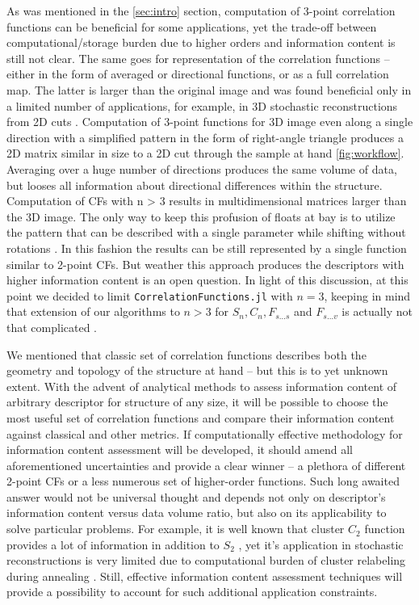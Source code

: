 \documentclass[reprint,amsmath,amssymb,aps,pre,showkeys,showpacs]{revtex4-1}
\newcommand{\code}[1]{\colorbox{light-gray}{\texttt{#1}}}
\begin{document}
As was mentioned in the \cref{sec:intro} section, computation of 3-point
correlation functions can be beneficial for some applications, yet the trade-off
between computational/storage burden due to higher orders and information
content is still not clear. The same goes for representation of the correlation
functions -- either in the form of averaged or directional functions, or as a
full correlation map. The latter is larger than the original image and was found
beneficial only in a limited number of applications, for example, in 3D
stochastic reconstructions from 2D cuts
\cite{cherkasov2021adaptive}. Computation of 3-point functions for 3D image even
along a single direction with a simplified pattern in the form of right-angle
triangle produces a 2D matrix similar in size to a 2D cut through the sample at
hand \cref{fig:workflow}. Averaging over a huge number of directions produces
the same volume of data, but looses all information about directional
differences within the structure. Computation of CFs with n > 3 results in
multidimensional matrices larger than the 3D image. The only way to keep this
profusion of floats at bay is to utilize the pattern that can be described with
a single parameter while shifting without rotations
\cite{chen2019hierarchical,chen2022}. In this fashion the results can be still
represented by a single function similar to 2-point CFs. But weather this
approach produces the descriptors with higher information content is an open
question.  In light of this discussion, at this point we decided to limit
\code{CorrelationFunctions.jl} with $n=3$, keeping in mind that extension of our
algorithms to $n>3$ for $S_n, C_n, F_{s...s}$ and $F_{s...v}$ is actually not
that complicated \cite{dimitrakopoulos2010high}.

We mentioned that classic set of correlation functions describes both the
geometry and topology of the structure at hand -- but this is to yet unknown
extent. With the advent of analytical methods \cite{cherkasov2023towards} to
assess information content of arbitrary descriptor for structure of any size, it
will be possible to choose the most useful set of correlation functions and
compare their information content against classical and other metrics. If
computationally effective methodology for information content assessment will be
developed, it should amend all aforementioned uncertainties and provide a clear
winner -- a plethora of different 2-point CFs or a less numerous set of
higher-order functions. Such long awaited answer would not be universal thought
and depends not only on descriptor's information content versus data volume
ratio, but also on its applicability to solve particular problems. For example,
it is well known that cluster $C_2$ function provides a lot of information in
addition to $S_2$ \cite{JiaoPNAS}, yet it's application in stochastic
reconstructions is very limited due to computational burden of cluster
relabeling during annealing \cite{PLoS_ONE}. Still, effective information
content assessment techniques will provide a possibility to account for such
additional application constraints.
\end{document}
